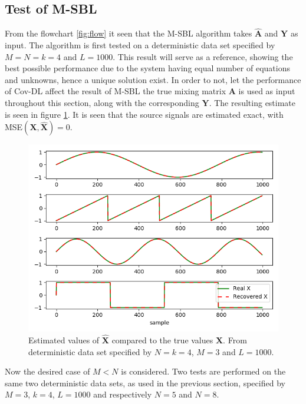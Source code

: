 \subsection{Test of M-SBL}
From the flowchart \ref{fig:flow} it seen that the M-SBL algorithm takes $\hat{\mathbf{A}}$ and $\mathbf{Y}$ as input.
The algorithm is first tested on a deterministic data set specified by $M = N = k = 4$ and $L=1000$. 
This result will serve as a reference, showing the best possible performance due to the system having equal number of equations and unknowns, hence a unique solution exist.
In order to not, let the performance of Cov-DL affect the result of M-SBL the true mixing matrix $\mathbf{A}$ is used as input throughout this section, along with the corresponding $\mathbf{Y}$. 
The resulting estimate is seen in figure \ref{fig:M-SBL_simple0}. 
It is seen that the source signals are estimated exact, with MSE$(\mathbf{X}, \hat{\mathbf{X}}) = 0$. 
\begin{figure}[H]
\centering
\includegraphics[scale=0.5]{figures/ch_6/M-SBL_simple0.png}
\caption{Estimated values of $\hat{\mathbf{X}}$ compared to the true values $\mathbf{X}$. From deterministic data set specified by $N = k = 4$, $M = 3$ and $L=1000$.}
\label{fig:M-SBL_simple0}
\end{figure}
\noindent
Now the desired case of $M < N$ is considered. 
Two tests are performed on the same two deterministic data sets, as used in the previous section, specified by $M = 3$, $k = 4$, $L=1000$ and respectively $N = 5$ and $N = 8$.

